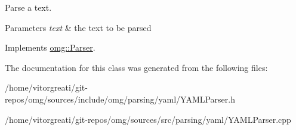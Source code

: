 Parse a text. 


\begin{DoxyParams}{Parameters}
{\em text} & the text to be parsed \\
\hline
\end{DoxyParams}


Implements \mbox{\hyperlink{classomg_1_1_parser_a50199f934cb3471777cb859a7289739f}{omg\+::\+Parser}}.



The documentation for this class was generated from the following files\+:\begin{DoxyCompactItemize}
\item 
/home/vitorgreati/git-\/repos/omg/sources/include/omg/parsing/yaml/Y\+A\+M\+L\+Parser.\+h\item 
/home/vitorgreati/git-\/repos/omg/sources/src/parsing/yaml/Y\+A\+M\+L\+Parser.\+cpp\end{DoxyCompactItemize}
